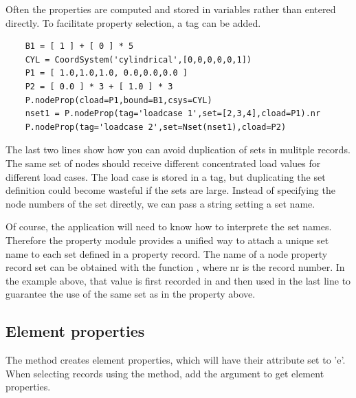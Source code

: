 {{{Often the properties are computed and stored in variables rather than entered directly. To facilitate property selection, a tag can be added.
\begin{verbatim}
    B1 = [ 1 ] + [ 0 ] * 5
    CYL = CoordSystem('cylindrical',[0,0,0,0,0,1])
    P1 = [ 1.0,1.0,1.0, 0.0,0.0,0.0 ]
    P2 = [ 0.0 ] * 3 + [ 1.0 ] * 3 
    P.nodeProp(cload=P1,bound=B1,csys=CYL)
    nset1 = P.nodeProp(tag='loadcase 1',set=[2,3,4],cload=P1).nr
    P.nodeProp(tag='loadcase 2',set=Nset(nset1),cload=P2)
\end{verbatim}
The last two lines show how you can avoid duplication of sets in mulitple records. The same set of nodes should receive different concentrated load values for different load cases. The load case is stored in a tag, but duplicating the set definition could become wasteful if the sets are large. Instead of specifying the node numbers of the set directly, we can pass a string setting a set name.

Of course, the application will need to know how to interprete the set names.
Therefore the property module provides a unified way to attach a unique set name to each set defined in a property record. The name of a node property record set can be obtained with the function , where nr is the record number. In the example above, that value is first recorded in  and then used in the last line to guarantee the use of the same set as in the property above.


\subsection{Element properties}
\label{sec:elem-properties}


The  method creates element properties, which will have their  attribute set to 'e'. When selecting records using the  method, add the  argument to get element properties.

}}}
